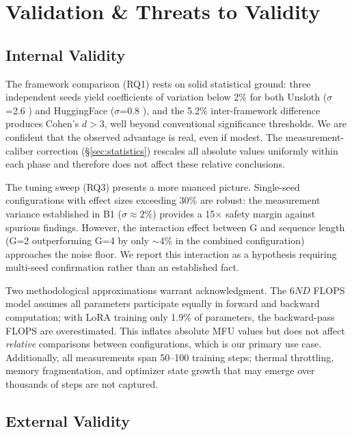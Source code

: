 \FloatBarrier
\section{Validation \& Threats to Validity}
\label{sec:validation}

\subsection{Internal Validity}

The framework comparison (RQ1) rests on solid statistical ground: three independent seeds yield coefficients of variation below 2\% for both Unsloth ($\sigma$=2.6 \toksec{}) and HuggingFace ($\sigma$=0.8 \toksec{}), and the 5.2\% inter-framework difference produces Cohen's $d>3$, well beyond conventional significance thresholds. We are confident that the observed advantage is real, even if modest. The measurement-caliber correction (\S\ref{sec:statistics}) rescales all absolute values uniformly within each phase and therefore does not affect these relative conclusions.

The tuning sweep (RQ3) presents a more nuanced picture. Single-seed configurations with effect sizes exceeding 30\% are robust: the measurement variance established in B1 ($\sigma \approx 2\%$) provides a 15$\times$ safety margin against spurious findings. However, the interaction effect between G and sequence length (G=2 outperforming G=4 by only $\sim$4\% in the combined configuration) approaches the noise floor. We report this interaction as a hypothesis requiring multi-seed confirmation rather than an established fact.

Two methodological approximations warrant acknowledgment. The $6ND$ FLOPS model assumes all parameters participate equally in forward and backward computation; with LoRA training only 1.9\% of parameters, the backward-pass FLOPS are overestimated. This inflates absolute MFU values but does not affect \emph{relative} comparisons between configurations, which is our primary use case. Additionally, all measurements span 50--100 training steps; thermal throttling, memory fragmentation, and optimizer state growth that may emerge over thousands of steps are not captured.

\subsection{External Validity}

